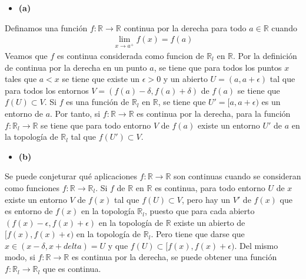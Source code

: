 \documentclass{article}
\begin{document}
\begin{itemize}
\item \bf (a) \rm
\end{itemize}
Definamos una función $f:\mathbb{R}\rightarrow \mathbb{R}$ continua por la derecha para todo $a\in \mathbb{R}$ cuando
\begin{eqnarray}
\lim_{x\rightarrow a^+ }f(x)=f(a)\nonumber
\end{eqnarray}
Veamos que $f$ es continua considerada como funcion de $\mathbb{R}_l$ en $\mathbb{R}$. Por la definición de continua por la derecha en un punto $a$, se tiene que para todos los puntos $x$ tales que $a<x$ se tiene que existe un $\epsilon>0$ y un abierto $U=(a, a+\epsilon)$ tal que para todos los entornos $V=(f(a)-\delta,f(a)+\delta)$ de $f(a)$ se tiene que $f(U) \subset V$. Si $f$ es una función de $\mathbb{R}_l$ en $\mathbb{R}$, se tiene que $U'=[a,a+\epsilon)$ es un entorno de $a$. Por tanto, si $f: \mathbb{R}\rightarrow \mathbb{R}$ es continua por la derecha, para la función $f: \mathbb{R}_l\rightarrow \mathbb{R}$ se tiene que para todo entorno $V$ de $f(a)$ existe un entorno $U'$ de $a$ en la topología de $\mathbb{R}_l$ tal que $f(U')\subset V$.
\begin{itemize}
\item \bf (b) \rm
\end{itemize}
Se puede conjeturar qué aplicaciones $f: \mathbb{R}\rightarrow \mathbb{R}$ son continuas cuando se consideran como funciones $f: \mathbb{R}\rightarrow \mathbb{R}_l$. Si $f$ de $\mathbb{R}$ en $\mathbb{R}$ es continua, para todo entorno $U$ de $x$ existe un entorno $V$ de $f(x)$ tal que $f(U)\subset V$, pero hay un $V'$ de $f(x)$ que es entorno de $f(x)$ en la topología $\mathbb{R}_l$, puesto que para cada abierto $(f(x)-\epsilon,f(x)+\epsilon)$ en la topología de  $\mathbb{R}$ existe un abierto de $[f(x),f(x)+\epsilon)$ en la topología de $\mathbb{R}_l$. Pero tiene que darse que $x\in (x-\delta,x+delta)=U$ y que $f(U)\subset [f(x),f(x)+\epsilon)$.  Del mismo modo, si $f: \mathbb{R}\rightarrow \mathbb{R}$ es continua por la derecha, se puede obtener una función $f: \mathbb{R}_l\rightarrow \mathbb{R}_l$ que es continua.
\end{document}
